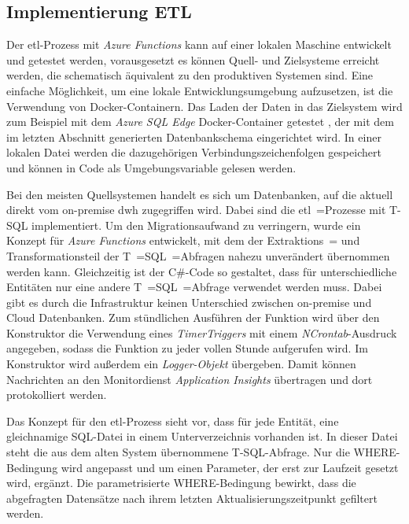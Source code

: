 \subsection{Implementierung ETL} \label{subsec:praktischeUmsetzung:etl}
Der \ac{etl}-Prozess mit \textit{Azure Functions} kann auf einer lokalen Maschine entwickelt und getestet werden, vorausgesetzt es können Quell- und Zielsysteme erreicht werden, die schematisch äquivalent zu den produktiven Systemen sind. Eine einfache Möglichkeit, um eine lokale Entwicklungsumgebung aufzusetzen, ist die Verwendung von Docker-Containern. Das Laden der Daten in das Zielsystem wird zum Beispiel mit dem \textit{Azure SQL Edge} Docker-Container getestet \cite[vgl.][]{msdoc_22_sql_docker}, der mit dem im letzten Abschnitt generierten Datenbankschema eingerichtet wird. In einer lokalen Datei werden die dazugehörigen Verbindungszeichenfolgen gespeichert und können in Code als Umgebungsvariable gelesen werden.

Bei den meisten Quellsystemen handelt es sich um Datenbanken, auf die aktuell direkt vom on-premise \ac{dwh} zugegriffen wird. Dabei sind die \ac{etl}~=Prozesse mit T-SQL implementiert. Um den Migrationsaufwand zu verringern, wurde ein Konzept für \textit{Azure Functions} entwickelt, mit dem der Extraktions~= und Transformationsteil der T~=SQL~=Abfragen nahezu unverändert übernommen werden kann. Gleichzeitig ist der C\#-Code so gestaltet, dass für unterschiedliche Entitäten nur eine andere T~=SQL~=Abfrage verwendet werden muss. Dabei gibt es durch die Infrastruktur keinen Unterschied zwischen on-premise und Cloud Datenbanken. Zum stündlichen Ausführen der Funktion wird über den Konstruktor die Verwendung eines \textit{TimerTriggers} mit einem \textit{NCrontab}-Ausdruck angegeben, sodass die Funktion zu jeder vollen Stunde aufgerufen wird. Im Konstruktor wird außerdem ein \textit{Logger-Objekt} übergeben. Damit können Nachrichten an den Monitordienst \textit{Application Insights} übertragen und dort protokolliert werden.

Das Konzept für den \ac{etl}-Prozess sieht vor, dass für jede Entität, eine gleichnamige SQL-Datei in einem Unterverzeichnis vorhanden ist. In dieser Datei steht die aus dem alten System übernommene T-SQL-Abfrage. Nur die WHERE-Bedingung wird angepasst und um einen Parameter, der erst zur Laufzeit gesetzt wird, ergänzt. Die parametrisierte WHERE-Bedingung bewirkt, dass die abgefragten Datensätze nach ihrem letzten Aktualisierungszeitpunkt gefiltert werden.

